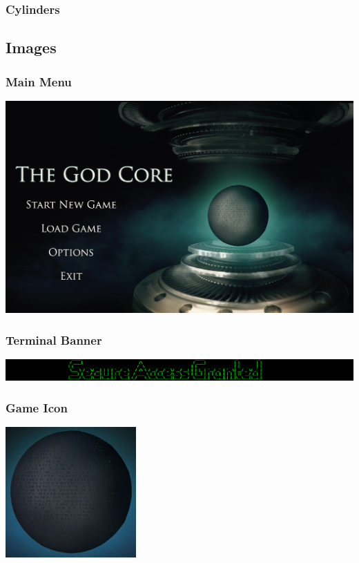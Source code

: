 \documentclass{article}
\begin{document}
\tiny{}
\subsubsection{Cylinders}

\small{}
\subsection{Images}

\subsubsection{Main Menu}
	\includegraphics[width=18cm]{../Resources/Images/Main}
\subsubsection{Terminal Banner}
	\includegraphics[width=18cm]{../Resources/Images/banner}
\subsubsection{Game Icon}
	\includegraphics[width=5cm]{../Resources/Images/Core}
	
\end{document}

